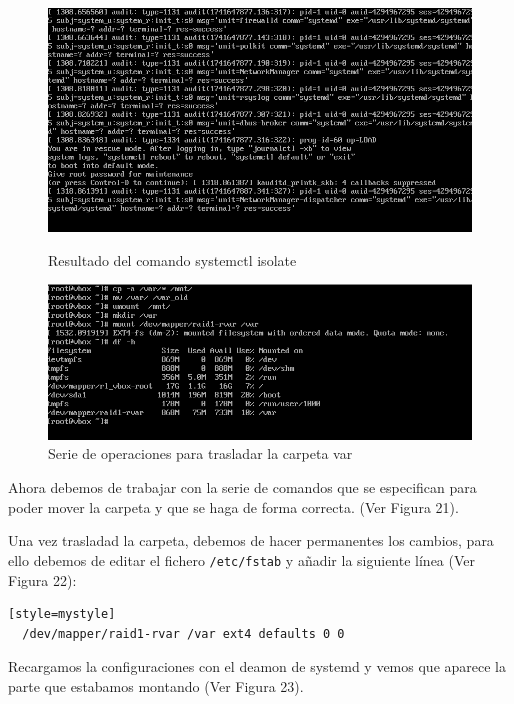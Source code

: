   \begin{figure}[htbp]
    \centering
    \begin{minipage}[b]{0.45\textwidth}
        \centering
        \includegraphics[width=\textwidth]{images/Bloque1/isolate.png}
        \caption{Resultado del comando systemctl isolate}
    \end{minipage}
    \hfill
    \begin{minipage}[b]{0.45\textwidth}
        \centering
        \includegraphics[width=\textwidth]{images/Bloque1/var.png}
        \caption{Serie de operaciones para trasladar la carpeta var}
    \end{minipage}
  \end{figure}

Ahora debemos de trabajar con la serie de comandos que se especifican para poder mover la carpeta y que se haga de forma correcta. (Ver Figura 21).

Una vez trasladad la carpeta, debemos de hacer permanentes los cambios, para ello debemos de editar el fichero \texttt{/etc/fstab} y añadir la siguiente línea (Ver Figura 22):

\begin{lstlisting}[style=mystyle][style=mystyle]
  /dev/mapper/raid1-rvar /var ext4 defaults 0 0
\end{lstlisting}

Recargamos la configuraciones con el deamon de systemd y vemos que aparece la parte que estabamos montando (Ver Figura 23).

